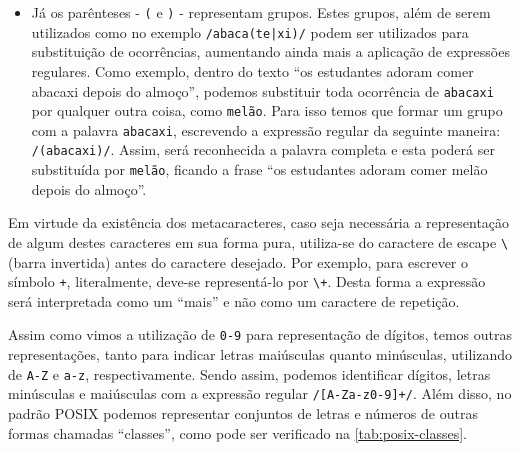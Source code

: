\begin{itemize}
    \item Já os parênteses - \texttt{(} e \texttt{)} - representam grupos. Estes grupos, além de serem utilizados como no exemplo \texttt{/abaca(te|xi)/} podem ser utilizados para substituição de ocorrências, aumentando ainda mais a aplicação de expressões regulares. Como exemplo, dentro do texto ``os estudantes adoram comer abacaxi depois do almoço'', podemos substituir toda ocorrência de \texttt{abacaxi} por qualquer outra coisa, como \texttt{melão}. Para isso temos que formar um grupo com a palavra \texttt{abacaxi}, escrevendo a expressão regular da seguinte maneira: \texttt{/(abacaxi)/}. Assim, será reconhecida a palavra completa e esta poderá ser substituída por \texttt{melão}, ficando a frase ``os estudantes adoram comer melão depois do almoço''.

\end{itemize}

Em virtude da existência dos metacaracteres, caso seja necessária a representação de algum destes caracteres em sua forma pura, utiliza-se do caractere de escape \texttt{\textbackslash{}} (barra invertida) antes do caractere desejado. Por exemplo, para escrever o símbolo \texttt{+}, literalmente, deve-se representá-lo por \texttt{\textbackslash{+}}. Desta forma a expressão será interpretada como um ``mais'' e não como um caractere de repetição.

Assim como vimos a utilização de \texttt{0-9} para representação de dígitos, temos outras representações, tanto para indicar letras maiúsculas quanto minúsculas, utilizando de \texttt{A-Z} e \texttt{a-z}, respectivamente. Sendo assim, podemos identificar dígitos, letras minúsculas e maiúsculas com a expressão regular \texttt{/[A-Za-z0-9]+/}. Além disso, no padrão POSIX podemos representar conjuntos de letras e números de outras formas chamadas ``classes'', como pode ser verificado na \autoref{tab:posix-classes}.

